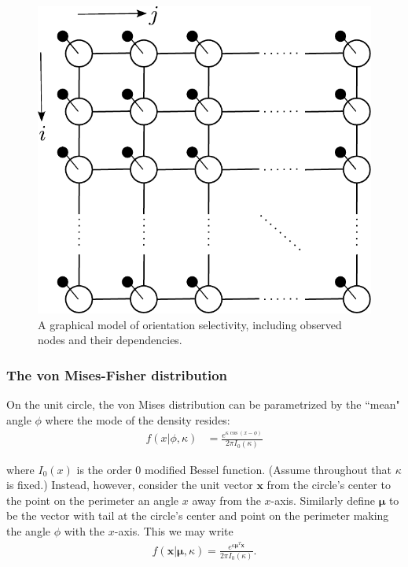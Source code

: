 \documentclass[11pt]{article}
\begin{document}
\begin{figure}[h]
\centering
\includegraphics[scale=0.50]{../fig/col_grid_gm_obs}
\caption{A graphical model of orientation selectivity, including observed nodes and their dependencies.}
\label{fig:som_gm2}
\end{figure}

\subsubsection*{The von Mises-Fisher distribution}

On the unit circle, the von Mises distribution can be parametrized by the ``mean" angle $\phi$ where the mode of the density resides:
%
\begin{align*}
f(x|\phi,\kappa) &= \frac{e^{\kappa\cos(x-\phi)}}{2\pi I_0(\kappa)}
\end{align*}

\noindent where $I_0(x)$ is the order 0 modified Bessel function. (Assume throughout that $\kappa$ is fixed.) Instead, however, consider the unit vector $\mathbf{x}$ from the circle's center to the point on the perimeter an angle $x$ away from the $x$-axis. Similarly define $\mathbf{\mu}$ to be the vector with tail at the circle's center and point on the perimeter making the angle $\phi$ with the $x$-axis. This we may write
%
\begin{align*}
f(\mathbf{x}|\mathbf{\mu},\kappa) = \frac{e^{\kappa \mathbf{\mu}^T \mathbf{x}}}{2\pi I_0(\kappa)}.
\end{align*}
\end{document}
